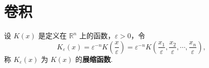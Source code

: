 \documentclass[../../main.tex]{subfiles}
\begin{document}
\section{卷积}






\begin{definition}[展缩函数]\label{definition:展缩函数}
设 \( K(x) \) 是定义在 \( \mathbb{R}^n \) 上的函数，\( \varepsilon > 0 \)，令
\[
K_{\varepsilon}(x) = \varepsilon^{-n} K\left( \frac{x}{\varepsilon} \right) = \varepsilon^{-n} K\left( \frac{x_1}{\varepsilon}, \frac{x_2}{\varepsilon}, \cdots, \frac{x_n}{\varepsilon} \right),
\]
称 \( K_{\varepsilon}(x) \) 为 \( K(x) \) 的\textbf{展缩函数}.
\end{definition}
\end{document}
